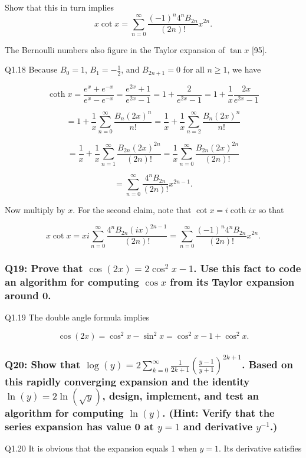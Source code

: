 \documentclass[8pt]{article}
\begin{document}
Show that this in turn implies
\[
x \cot x = \sum_{n=0}^{\infty} \frac{(-1)^n 4^n B_{2n}}{(2n)!} x^{2n}.
\]

The Bernoulli numbers also figure in the Taylor expansion of \(\tan x\) [95].

Q1.18 Because \(B_0 = 1\), \(B_1 = -\frac{1}{2}\), and \(B_{2n+1} = 0\) for all \(n \geq 1\), we have

\[
\coth x = \frac{e^x + e^{-x}}{e^x - e^{-x}} = \frac{e^{2x} + 1}{e^{2x} - 1} = 1 + \frac{2}{e^{2x} - 1} = 1 + \frac{1}{x} \frac{2x}{e^{2x} - 1}
\]

\[
= 1 + \frac{1}{x} \sum_{n=0}^{\infty} \frac{B_n (2x)^n}{n!} = \frac{1}{x} + \frac{1}{x} \sum_{n=2}^{\infty} \frac{B_n (2x)^n}{n!}
\]

\[
= \frac{1}{x} + \frac{1}{x} \sum_{n=1}^{\infty} \frac{B_{2n} (2x)^{2n}}{(2n)!} = \frac{1}{x} \sum_{n=0}^{\infty} \frac{B_{2n} (2x)^{2n}}{(2n)!}
\]

\[
= \sum_{n=0}^{\infty} \frac{4^n B_{2n}}{(2n)!} x^{2n-1}.
\]

Now multiply by \(x\). For the second claim, note that \(\cot x = i \coth ix\) so that

\[
x \cot x = xi \sum_{n=0}^{\infty} \frac{4^n B_{2n} (ix)^{2n-1}}{(2n)!} = \sum_{n=0}^{\infty} \frac{(-1)^n 4^n B_{2n}}{(2n)!} x^{2n}.
\]

\subsubsection*{Q19: Prove that \(\cos(2x) = 2 \cos^2 x - 1\). Use this fact to code an algorithm for computing \(\cos x\) from its Taylor expansion around 0.}

Q1.19 The double angle formula implies

\[
\cos(2x) = \cos^2 x - \sin^2 x = \cos^2 x - 1 + \cos^2 x.
\]

\subsubsection*{Q20: Show that \(\log(y) = 2 \sum_{k=0}^{\infty} \frac{1}{2k+1} \left(\frac{y-1}{y+1}\right)^{2k+1}\). Based on this rapidly converging expansion and the identity \(\ln(y) = 2 \ln(\sqrt{y})\), design, implement, and test an algorithm for computing \(\ln(y)\). (Hint: Verify that the series expansion has value 0 at \(y = 1\) and derivative \(y^{-1}\).)}

Q1.20 It is obvious that the expansion equals 1 when \(y = 1\). Its derivative satisfies
\end{document}

